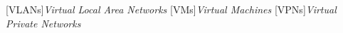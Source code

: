 \begin{acronym}[]
	[VLANs]{{\it Virtual Local Area Networks}}
	[VMs]{{\it Virtual Machines}}
	[VPNs]{{\it Virtual Private Networks}}
\end{acronym}

